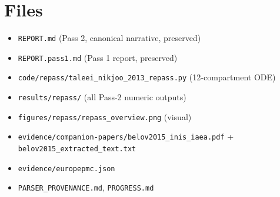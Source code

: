 \documentclass[11pt]{article}
\begin{document}


\section{Files}
\begin{itemize}
  \item \texttt{REPORT.md} (Pass 2, canonical narrative, preserved)
  \item \texttt{REPORT.pass1.md} (Pass 1 report, preserved)
  \item \texttt{code/repass/taleei\_nikjoo\_2013\_repass.py} (12-compartment ODE)
  \item \texttt{results/repass/} (all Pass-2 numeric outputs)
  \item \texttt{figures/repass/repass\_overview.png} (visual)
  \item \texttt{evidence/companion-papers/belov2015\_inis\_iaea.pdf} + \texttt{belov2015\_extracted\_text.txt}
  \item \texttt{evidence/europepmc.json}
  \item \texttt{PARSER\_PROVENANCE.md}, \texttt{PROGRESS.md}
\end{itemize}
\end{document}
